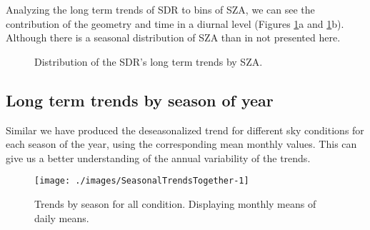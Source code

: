 \documentclass[preprint, 3p,
authoryear]{elsarticle} %
\begin{document}
Analyzing the long term trends of SDR to bins of SZA, we can see the
contribution of the geometry and time in a diurnal level (Figures
\ref{fig:szatrends}a and \ref{fig:szatrends}b). Although there is a
seasonal distribution of SZA than in not presented here.

\begin{figure}[h!]

{\centering {}

}

\caption{Distribution of the SDR's long term trends by SZA.}\label{fig:szatrends}
\end{figure}

\hypertarget{long-term-trends-by-season-of-year}{%
\subsection{Long term trends by season of
year}\label{long-term-trends-by-season-of-year}}

Similar we have produced the deseasonalized trend for different sky
conditions for each season of the year, using the corresponding mean
monthly values. This can give us a better understanding of the annual
variability of the trends.

\begin{figure}[h!]

{\centering \texttt{[image: ./images/SeasonalTrendsTogether-1]} 

}

\caption{Trends by season for all condition. Displaying monthly means of daily means.}\label{fig:seasonalALL}
\end{figure}
\end{document}
